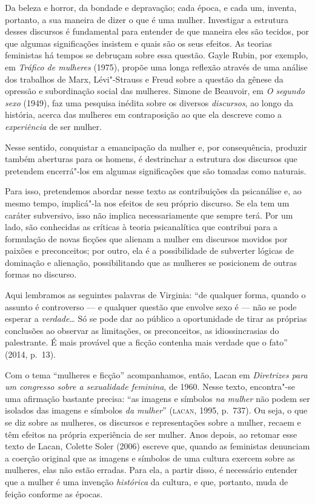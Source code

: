 Da beleza e horror, da bondade e depravação; cada época, e cada um,
inventa, portanto, a sua maneira de dizer o que é uma mulher. Investigar
a estrutura desses discursos é fundamental para entender de que maneira
eles são tecidos, por que algumas significações insistem e quais são os
seus efeitos. As teorias feministas há tempos se debruçam sobre essa
questão. Gayle Rubin, por exemplo, em \emph{Tráfico de mulheres} (1975),
propõe uma longa reflexão através de uma análise dos trabalhos de Marx,
Lévi"-Strauss e Freud sobre a questão da gênese da opressão e
subordinação social das mulheres. Simone de Beauvoir, em \emph{O segundo
sexo} (1949), faz uma pesquisa inédita sobre os diversos
\emph{discursos}, ao longo da história, acerca das mulheres em
contraposição ao que ela descreve como a \emph{experiência} de ser
mulher.

Nesse sentido, conquistar a emancipação da mulher e, por consequência,
produzir também aberturas para os homens, é destrinchar a estrutura dos
discursos que pretendem encerrá"-los em algumas significações que são
tomadas como naturais.

Para isso, pretendemos abordar nesse texto as contribuições da
psicanálise e, ao mesmo tempo, implicá"-la nos efeitos de seu próprio
discurso. Se ela tem um caráter subversivo, isso não implica
necessariamente que sempre terá. Por um lado, são conhecidas as críticas
à teoria psicanalítica que contribui para a formulação de novas ficções
que alienam a mulher em discursos movidos por paixões e preconceitos;
por outro, ela é a possibilidade de subverter lógicas de dominação e
alienação, possibilitando que as mulheres se posicionem de outras formas
no discurso.

Aqui lembramos as seguintes palavras de Virginia: ``de qualquer forma,
quando o assunto é controverso --- e qualquer questão que envolve sexo é
--- não se pode esperar a \emph{verdade}\ldots{} Só se pode dar ao público a
oportunidade de tirar as próprias conclusões ao observar as limitações,
os preconceitos, as idiossincrasias do palestrante. É mais provável que
a ficção contenha mais verdade que o fato'' (2014, p.~13).

\asterisc

Com o tema ``mulheres e ficção'' acompanhamos, então, Lacan em
\emph{Diretrizes para um congresso sobre a sexualidade feminina}, de
1960. Nesse texto, encontra"-se uma afirmação bastante precisa: ``as
imagens e símbolos \emph{na mulher} não podem ser isolados das imagens e
símbolos \emph{da mulher}'' (\textsc{lacan}, 1995, p.~737). Ou seja, o que
se diz sobre as mulheres, os discursos e representações sobre a mulher,
recaem e têm efeitos na própria experiência de ser mulher. Anos depois,
ao retomar esse texto de Lacan, Colette Soler (2006) escreve que, quando
as feministas denunciam a coerção original que as imagens e símbolos de
uma cultura exercem sobre as mulheres, elas não estão erradas. Para ela,
a partir disso, é necessário entender que a mulher é uma invenção
\emph{histórica} da cultura, e que, portanto, muda de feição conforme as
épocas.

